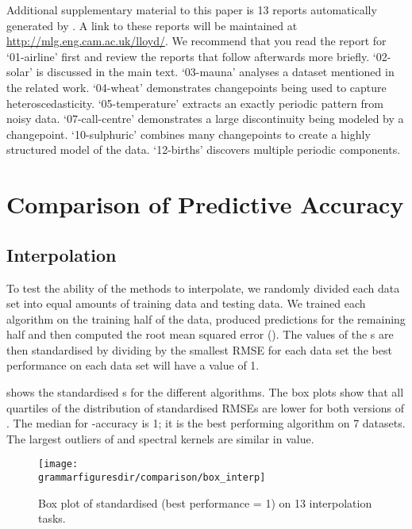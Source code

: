 Additional supplementary material to this paper is 13 reports automatically generated by \procedurename{}.
A link to these reports will be maintained at \url{http://mlg.eng.cam.ac.uk/lloyd/}.
We recommend that you read the report for `01-airline' first and review the reports that follow afterwards more briefly.
`02-solar' is discussed in the main text.
`03-mauna' analyses a dataset mentioned in the related work.
`04-wheat' demonstrates changepoints being used to capture heteroscedasticity.
`05-temperature' extracts an exactly periodic pattern from noisy data.
`07-call-centre' demonstrates a large discontinuity being modeled by a changepoint.
`10-sulphuric' combines many changepoints to create a highly structured model of the data.
`12-births' discovers multiple periodic components.

\fi


\iffalse


\section{Comparison of Predictive Accuracy}
\label{sec:accuracy-appendix}


\subsection{Interpolation}
\label{sec:interpolation-appendix}

To test the ability of the methods to interpolate, we randomly divided each data set into equal amounts of training data and testing data.
We trained each algorithm on the training half of the data, produced predictions for the remaining half and then computed the root mean squared error (\RMSE{}).
The values of the \RMSE{}s are then standardised by dividing by the smallest RMSE for each data set \ie the best performance on each data set will have a value of 1.

 shows the standardised \RMSE{}s for the different algorithms.
The box plots show that all quartiles of the distribution of standardised RMSEs are lower for both versions of \procedurename{}.
The median for \procedurename{}-accuracy is 1; it is the best performing algorithm on 7 datasets.
The largest outliers of \procedurename{} and spectral kernels are similar in value.

\begin{figure*}[ht]
\centering
\texttt{[image: \\grammarfiguresdir/comparison/box\_interp]}
\caption[Comparision of interpolation error of all methods on 13 time-series datasets.]
{Box plot of standardised \RMSE{} (best performance = 1) on 13 interpolation tasks.}
\label{fig:box_interp}
\end{figure*}

